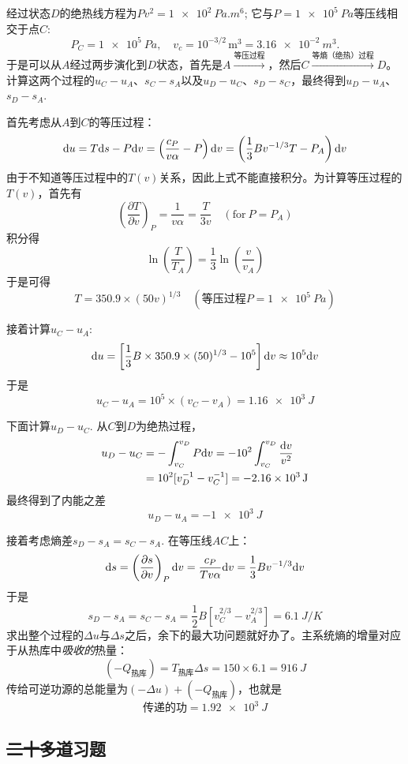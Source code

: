经过状态$D$的绝热线方程为$Pv^2 = \SI{1e2}{Pa.m^6}$; 它与$P = \SI{1e5}{Pa}$等压线相交于点$C$:
\[
	P_C = \SI{1e5}{Pa}, \quad v_c = 10^{-3/2}\, \mathrm{m}^3 = \SI{3.16e-2}{m^3}.
\]
于是可以从$A$经过两步演化到$D$状态，首先是$A \stackrel{\text{等压过程}}{\longrightarrow}$，然后$C \stackrel{\text{等熵（绝热）过程}}{\longrightarrow} D$。计算这两个过程的$u_C - u_A$、$s_C - s_A$以及$u_D - u_C$、$s_D - s_C$，最终得到$u_D - u_A$、$s_D - s_A$.

首先考虑从$A$到$C$的等压过程：
\[
	\mathrm{d} u = T \mathrm{d} s - P \mathrm{d} v = \left( \frac{c_P}{v\alpha} - P \right) \mathrm{d} v = \left( \frac{1}{3} B v^{-1/3} T - P_A \right) \mathrm{d} v
\]
由于不知道等压过程中的$T(v)$关系，因此上式不能直接积分。为计算等压过程的$T(v)$，首先有
\[
	\left( \frac{\partial T}{\partial v} \right)_P = \frac{1}{v \alpha} = \frac{T}{3v} \quad (\text{for}\ P = P_A)
\]
积分得
\[
	\ln \left( \frac{T}{T_A} \right) = \frac{1}{3} \ln \left( \frac{v}{v_A} \right)
\]
于是可得 
\[
	T = 350.9 \times (50v)^{1/3} \quad (\text{等压过程}P = \SI{1e5}{Pa})
\]

接着计算$u_C - u_A$:
\[
	\mathrm{d} u = \left[ \frac{1}{3} B \times 350.9 \times (50)^{1/3} - 10^5 \right] \mathrm{d} v \approx 10^5 \mathrm{d} v
\]
于是 
\[
	u_C - u_A = 10^5 \times (v_C - v_A) = \SI{1.16e3}{J}
\]

下面计算$u_D - u_C$. 从$C$到$D$为绝热过程，
\[
\begin{split}
	u_D - u_C &= -\int_{v_C}^{v_D} P\mathrm{d} v = -10^2 \int_{v_C}^{v_D} \frac{\mathrm{d} v}{v^2} \\
	&= 10^2 [v_D^{-1} - v_C^{-1} ] = -\SI{2.16e3}{J}
\end{split}
\]
最终得到了内能之差
\[
	u_D - u_A = -\SI{1e3}{J}
\]

接着考虑熵差$s_D - s_A = s_C - s_A$. 在等压线$AC$上：
\[
	\mathrm{d} s = \left( \frac{\partial s}{\partial v} \right)_P \mathrm{d} v = \frac{c_P}{Tv\alpha} \mathrm{d} v = \frac{1}{3} B v^{-1/3} \mathrm{d} v
\]
于是 
\[
	s_D - s_A = s_C - s_A = \frac{1}{2} B \left[v_C^{2/3} - v_A^{2/3} \right] = \SI{6.1}{J \per K}
\]
求出整个过程的$\Delta u$与$\Delta s$之后，余下的最大功问题就好办了。主系统熵的增量对应于从热库中{\it 吸收的}热量：
\[
	(-Q_{\text{热库}}) = T_{\text{热库}} \Delta s = 150 \times 6.1 = \SI{916}{J}
\]
传给可逆功源的总能量为$(-\Delta u) + (-Q_{\text{热库}})$，也就是 
\[
	\text{传递的功} = \SI{1.92e3}{J}
\]

\subsection*{\sout{二十多道}习题}



